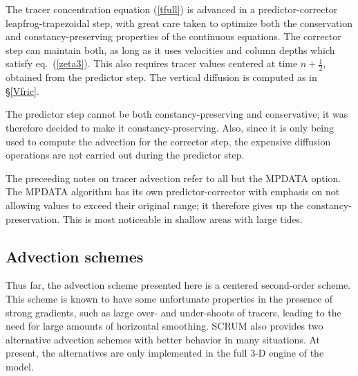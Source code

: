 The tracer concentration equation (\ref{tfull}) is advanced in a
predictor-corrector leapfrog-trapezoidal step, with great care taken to
optimize both the conservation and constancy-preserving properties of the
continuous equations. The corrector step can maintain both, as long as it
uses velocities and column depths which satisfy eq.~(\ref{zeta3}). This
also requires tracer values centered at time $n+\frac{1}{2}$, obtained
from the predictor step. The vertical diffusion is computed as in
\S\ref{Vfric}.

The predictor step cannot be both constancy-preserving and conservative; it
was therefore decided to make it constancy-preserving. Also, since it is
only being used to compute the advection for the corrector step, the
expensive diffusion operations are not carried out during the predictor step.

The preceeding notes on tracer advection refer to all but the MPDATA
option. The MPDATA algorithm has its own predictor-corrector with
emphasis on not allowing values to exceed their original range;
it therefore gives up the constancy-preservation. This is most
noticeable in shallow areas with large tides.

\subsection{Advection schemes}
\label{Advect}
Thus far, the advection scheme presented here is a centered
second-order scheme. This scheme is known to have some unfortunate
properties in the presence of strong gradients, such as large over- and
under-shoots of tracers, leading to the need for large amounts of
horizontal smoothing. SCRUM also provides two alternative advection
schemes with better behavior in many situations. At present, the
alternatives are only implemented in the full 3-D engine of the model.

